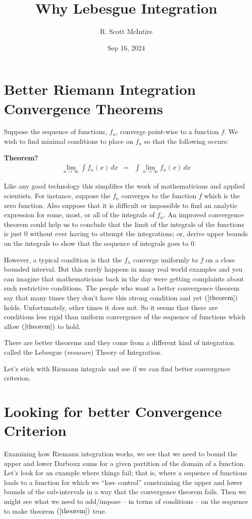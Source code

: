 \documentclass{article}
\title{Why Lebesgue Integration}
\author{R. Scott McIntire}
\date{Sep 16, 2024}
\begin{document}
\maketitle


\section{Better Riemann Integration Convergence Theorems}
Suppose the sequence of functions, $f_n$, converge point-wise to a function $f$.
We wish to find minimal conditions to place on $f_n$ so that the following occurs:

{\bf Theorem?}
\begin{eqnarray}
	\lim_{n \rightarrow \infty}\limits \int f_n(x) \, dx & = & \int \lim_{n \rightarrow \infty}\limits f_n(x) \, dx \label{theorem}
\end{eqnarray}

Like any good technology this simplifies the work of mathematicians 
and applied scientists. For instance, suppose the $f_n$ converges to the function $f$ 
which is the zero function. Also suppose that it is difficult or impossible to 
find an analytic expression for some, most, or all of the integrals of $f_n$. 
An improved convergence theorem could help us to conclude that the limit of the integrals of 
the functions is just $0$ without ever having to attempt the integrations; or, 
derive upper bounds on the integrals to show that 
the sequence of integrals goes to $0$.

However, a typical condition is that the $f_n$ converge 
uniformly to $f$ on a close bounded interval. 
But this rarely happens in many real world examples and you can imagine that
mathematicians back in the day
were getting complaints about such restrictive 
conditions. The people who want a better convergence theorem say that many 
times they don't have this strong condition and yet $(\ref{theorem})$
holds. Unfortunately, other times it does not. So it seems that there are 
conditions less rigid than uniform convergence of the sequence of 
functions which allow $(\ref{theorem})$ to hold.

There are better theorems and they come from a different kind of integration called 
the Lebesgue ({\em measure\/}) Theory of Integration.

Let's stick with Riemann integrals and see if we can find better convergence 
criterion.

\section{Looking for better Convergence Criterion}
Examining how Riemann integration works, we see that we need to bound the upper 
and lower Darboux sums for a given partition of the domain of a function. 
Let's look for an example where things fail; that is, where 
a sequence of functions leads to a function for which we ``lose control'' 
constraining the upper and lower bounds of the sub-intervals in a way that the 
convergence theorem fails. Then we might see what we need to add/impose 
-- in terms of conditions -- on the sequence to make theorem 
$(\ref{theorem})$ true.
\end{document}
